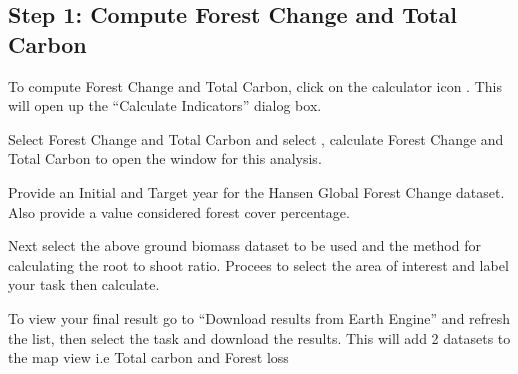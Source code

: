 \documentclass[letterpaper,10pt,english]{sphinxmanual}
\begin{document}
\subsection{Step 1: Compute Forest Change and Total Carbon}
\label{\detokenize{Qgis_Plugin/Calculate_forest:step-1-compute-forest-change-and-total-carbon}}
\sphinxAtStartPar
To compute Forest Change and Total Carbon, click on the calculator icon . This will open up the
“Calculate Indicators” dialog box.

\sphinxAtStartPar
Select Forest Change and Total Carbon and select , calculate Forest Change and Total Carbon
to open the window for this analysis.




\sphinxAtStartPar
Provide an Initial and Target year for the Hansen Global Forest Change dataset. Also provide
a value considered forest cover percentage.


\sphinxAtStartPar
Next select the above ground biomass dataset to be used and the method for calculating the root to shoot
ratio. Procees to select the area of interest and label your task then calculate.


\sphinxAtStartPar
To view your final result go to “Download results from Earth Engine” and refresh the list, then select
the task and download the results. This will add 2 datasets to the map view i.e Total carbon and Forest loss

\end{document}
